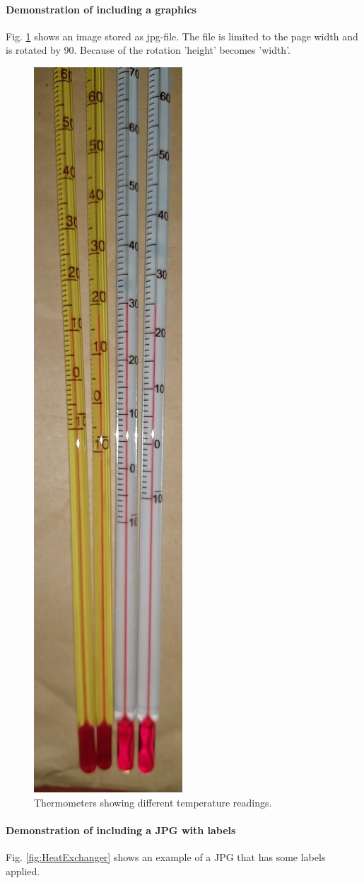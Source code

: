 \paragraph{Demonstration of including a graphics}
Fig. \ref{fig:ndulogo} shows an image stored as jpg-file. The file is limited to the page width and is rotated by 90\textdegree. Because of the rotation 'height' becomes 'width'.

\begin{figure}
	\centering
	\includegraphics[height=1\textwidth, angle=90]{600-Appendices/Examples/Thermometer.jpg}
	\caption{Thermometers showing different temperature readings.}
	\label{fig:ndulogo}
\end{figure}

\paragraph{Demonstration of including a JPG with labels}
Fig. \ref{fig:HeatExchanger} shows an example of a JPG that has some labels applied.

